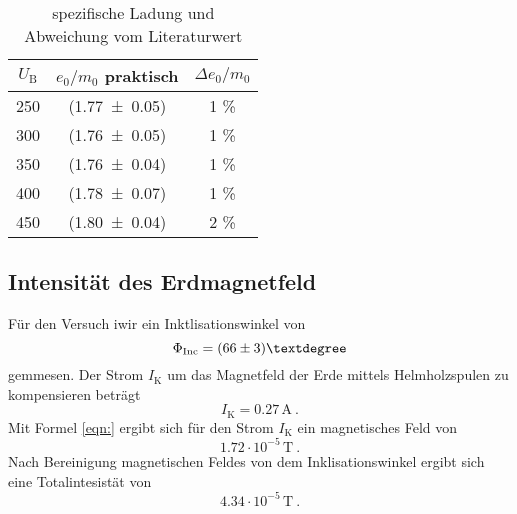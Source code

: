 \begin{table}
  \centering
  \begin{tabular}{c| c c}
    \toprule
    $U_\text{B}$  & $e_0/m_0$ praktisch & $\Delta e_0/m_0$ \\
    \midrule
    	250	& (\num{1.77 +- 0.05}) & 1 \% \\
	300	& (\num{1.76 +- 0.05}) & 1 \% \\
	350	& (\num{1.76 +- 0.04}) & 1 \% \\
	400	& (\num{1.78 +- 0.07}) & 1 \% \\
	450	& (\num{1.80 +- 0.04}) & 2 \% \\
    \bottomrule
  \end{tabular}
  \caption{spezifische Ladung und Abweichung vom Literaturwert}
  \label{tab:e0m0}
\end{table}
\subsection{Intensität des Erdmagnetfeld}
Für den Versuch iwir ein Inktlisationswinkel von 
\begin{equation}
  \Phi_\text{Inc} = (\num{66 +-3})°
  \label{eqn:Inc}
\end{equation} 
gemmesen. Der Strom $I_\text{K}$ um das Magnetfeld der Erde mittels Helmholzspulen zu kompensieren beträgt 
\begin{equation}
  I_\text{K} = 0.27 \, \text{A} \ .
  \label{IK}
\end{equation}
Mit Formel \ref{eqn:} ergibt sich für den Strom $I_\text{K}$ ein magnetisches Feld von 
\begin{equation}
  1.72 \cdot 10^{-5} \, \text{T} \ .
  \label{eqn:Binc}
\end{equation}
Nach Bereinigung magnetischen Feldes von dem Inklisationswinkel ergibt sich eine Totalintesistät von 
\begin{equation}
  4.34 \cdot 10^{-5} \, \text{T} \ .
  \label{eqn:Berd}
\end{equation}
